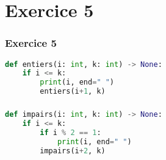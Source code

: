 \documentclass[svgnames,11pt]{beamer}
\begin{document}
\section{Exercice 5}
\begin{frame}[fragile]
    \frametitle{Exercice 5}

\begin{center}
\begin{lstlisting}[language=Python , basicstyle=\ttfamily\small, xleftmargin=2em, xrightmargin=2em]
def entiers(i: int, k: int) -> None:
    if i <= k:
        print(i, end=" ")
        entiers(i+1, k)
\end{lstlisting}
\end{center}  

\end{frame}
\begin{frame}[fragile]
    \frametitle{}

\begin{center}
\begin{lstlisting}[language=Python , basicstyle=\ttfamily\small, xleftmargin=2em, xrightmargin=2em]
def impairs(i: int, k: int) -> None:
    if i <= k:
        if i % 2 == 1:
            print(i, end=" ")
        impairs(i+2, k)
\end{lstlisting}
\end{center}

\end{frame}
\end{document}

